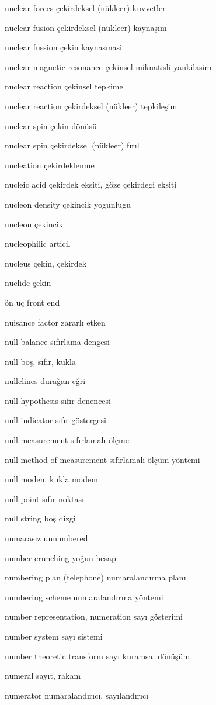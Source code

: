 \documentclass[12pt,fleqn]{article}\usepackage{../../common}
\begin{document}
nuclear forces çekirdeksel (nükleer) kuvvetler

nuclear fusion çekirdeksel (nükleer) kaynaşım

nuclear fussion çekin kaynasmasi

nuclear magnetic resonance çekinsel miknatisli yankilasim

nuclear reaction çekinsel tepkime

nuclear reaction çekirdeksel (nükleer) tepkileşim

nuclear spin çekin dönüsü

nuclear spin çekirdeksel (nükleer) fırıl

nucleation çekirdeklenme

nucleic acid çekirdek eksiti, göze çekirdegi eksiti

nucleon density çekincik yogunlugu

nucleon çekincik

nucleophilic articil

nucleus çekin, çekirdek

nuclide çekin

ön uç front end

nuisance factor zararlı etken

null balance sıfırlama dengesi

null boş, sıfır, kukla

nullclines durağan eğri

null hypothesis sıfır denencesi

null indicator sıfır göstergesi

null measurement sıfırlamalı ölçme

null method of measurement sıfırlamalı ölçüm yöntemi

null modem kukla modem

null point sıfır noktası

null string boş dizgi

numarasız unnumbered

number crunching yoğun hesap

numbering plan (telephone) numaralandırma planı

numbering scheme numaralandırma yöntemi

number representation, numeration sayı gösterimi

number system sayı sistemi

number theoretic transform sayı kuramsal dönüşüm

numeral sayıt, rakam

numerator numaralandırıcı, sayılandırıcı
\end{document}
